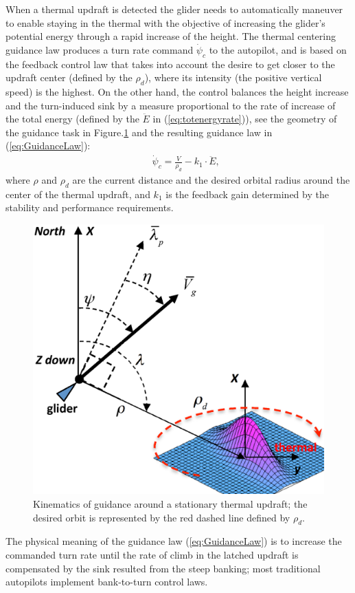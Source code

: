 \documentclass[letterpaper, 10 pt, conference]{ieeeconf}  %
\begin{document}

When a thermal updraft is detected the glider needs to automatically maneuver to enable staying in the thermal with the objective of increasing the glider's potential energy through a rapid increase of the height. The thermal centering guidance law produces a turn rate command $\dot{\psi}_{c}$ to the autopilot, and is based on the feedback control law that takes into account the desire to get closer to the updraft center (defined by the $\rho_d$), where its intensity (the positive vertical speed) is the highest. On the other hand, the control balances the height increase and the turn-induced sink by a measure proportional to the rate of increase of the total energy (defined by the $\ddot{E}$ in (\ref{eq:totenergyrate})), see the geometry of the guidance task in Figure.\ref{fig:ThermaG} and the resulting guidance law in (\ref{eq:GuidanceLaw}):
\begin{eqnarray}
    && \dot{\psi}_{c}=\frac{V}{\rho_d}-k_1 \cdot \ddot{E},
    \label{eq:GuidanceLaw}
\end{eqnarray}
where $\rho$ and $\rho_d$ are the current distance and the desired orbital radius around the center of the thermal updraft, and $k_1$ is the feedback gain determined by the stability and performance requirements.
\begin{figure}[thpb]
  \centering
  \includegraphics[scale=0.3]{Figures/ThermalG.eps}
  \caption{Kinematics of guidance around a stationary thermal updraft;
  the desired orbit is represented by the red dashed line defined by $\rho_d$.}
  \label{fig:ThermaG}
\end{figure}
The physical meaning of the guidance law (\ref{eq:GuidanceLaw}) is to increase the commanded turn rate until the rate of climb in the latched updraft is compensated by the sink resulted from the steep banking; most traditional autopilots implement bank-to-turn control laws.
\end{document}
